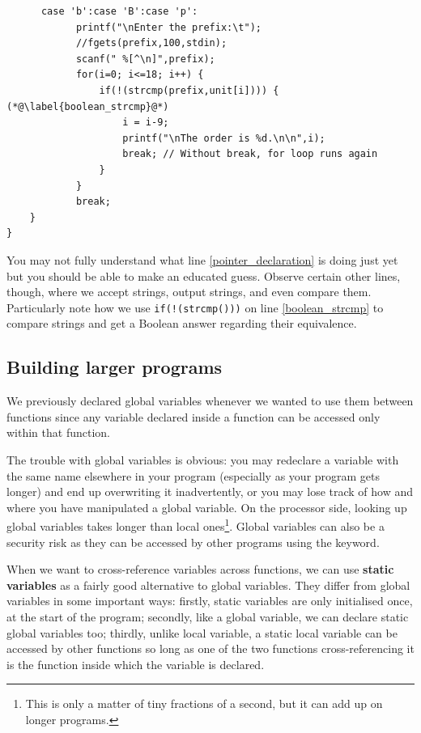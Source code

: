 \documentclass[11pt,oneside]{article}
\begin{document}
{{{{{{{{{{{{\begin{lstlisting}
      case 'b':case 'B':case 'p':
            printf("\nEnter the prefix:\t");
            //fgets(prefix,100,stdin);
            scanf(" %[^\n]",prefix);
            for(i=0; i<=18; i++) {
                if(!(strcmp(prefix,unit[i]))) { (*@\label{boolean_strcmp}@*)
                    i = i-9;
                    printf("\nThe order is %d.\n\n",i);
                    break; // Without break, for loop runs again
                }
            }
            break;
    }
}
\end{lstlisting}

You may not fully understand what line \ref{pointer_declaration} is doing just yet but you should be able to make an educated guess. Observe certain other lines, though, where we accept strings, output strings, and even compare them. Particularly note how we use \verb+if(!(strcmp()))+ on line \ref{boolean_strcmp} to compare strings and get a Boolean answer regarding their equivalence.

\subsection{Building larger programs}\label{sec:building-larger-programs}

We previously declared global variables whenever we wanted to use them between functions since any variable declared inside a function can be accessed only within that function.

The trouble with global variables is obvious: you may redeclare a variable with the same name elsewhere in your program (especially as your program gets longer) and end up overwriting it inadvertently, or you may lose track of how and where you have manipulated a global variable. On the processor side, looking up global variables takes longer than local ones\footnote{This is only a matter of tiny fractions of a second, but it can add up on longer programs.}. Global variables can also be a security risk as they can be accessed by other programs using the  keyword.

When we want to cross-reference variables across functions, we can use \textbf{static variables} as a fairly good alternative to global variables. They differ from global variables in some important ways: firstly, static variables are only initialised once, at the start of the program; secondly, like a global variable, we can declare static global variables too; thirdly, unlike local variable, a static local variable can be accessed by other functions so long as one of the two functions cross-referencing it is the function inside which the variable is declared.

}}}}}}}}}}}}
\end{document}
